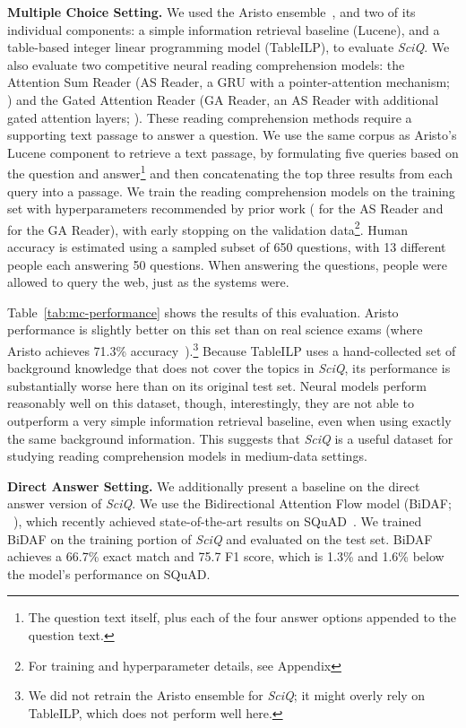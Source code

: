\textbf{Multiple Choice Setting.}  We used the Aristo ensemble~\cite{Clark2016Combining}, and two of its individual components: a simple information retrieval baseline (Lucene), and a table-based integer linear programming model (TableILP), to evaluate \emph{SciQ}.  
We also evaluate two competitive neural reading comprehension models: the Attention Sum Reader (AS Reader, a GRU with a pointer-attention mechanism; ) and the Gated Attention Reader (GA Reader, an AS Reader with additional gated attention layers; ).  These reading comprehension methods require a supporting text passage to answer a question.  We use the same corpus as Aristo's Lucene component to retrieve a text passage, by formulating five queries based on the question and answer\footnote{The question text itself, plus each of the four answer options appended to the question text.} and then concatenating the top three results from each query into a passage.  We train the reading comprehension models on the training set with hyperparameters recommended by prior work (\cite{Onishi2016Who} for the AS Reader and \cite{Dgingra2016Gated} for the GA Reader), with early stopping on the validation data\footnote{For training and hyperparameter details, see Appendix}.  Human accuracy is estimated using a sampled subset of 650 questions, with 13 different people each answering 50 questions.  When answering the questions, people were allowed to query the web, just as the systems were.

Table~\ref{tab:mc-performance} shows the results of this evaluation.  Aristo performance is slightly better on this set than on real science exams (where Aristo achieves 71.3\%
accuracy~\cite{Clark2016Combining}).\footnote{We did not retrain the Aristo ensemble for
\emph{SciQ}; it might overly rely on TableILP, which does not perform well here.}  Because TableILP uses a hand-collected set of background knowledge that does not cover the topics in
\emph{SciQ}, its performance is substantially worse here than on its original test set.  Neural models perform reasonably well on this dataset, though, interestingly, they are not able to outperform a very simple information retrieval baseline, even when using exactly the same background information.  This suggests that \emph{SciQ} is a useful dataset for studying reading comprehension models in medium-data settings.

\textbf{Direct Answer Setting.}  We additionally present a baseline on the direct answer version of \emph{SciQ}.  We use the Bidirectional Attention Flow model (BiDAF; ~), which recently achieved state-of-the-art results on SQuAD~\cite{rajpurkar2016SQUAD}.  We trained BiDAF on the training portion of
\emph{SciQ} and evaluated on the test set.  BiDAF achieves a 66.7\% exact match and 75.7 F1 score, which is 1.3\% and 1.6\% below the model's performance on SQuAD.

